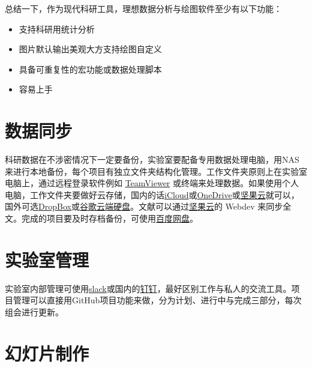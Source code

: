 \documentclass[]{tufte-book}
\providecommand{\tightlist}{%
  \setlength{\itemsep}{0pt}\setlength{\parskip}{0pt}}
\begin{document}
总结一下，作为现代科研工具，理想数据分析与绘图软件至少有以下功能：

\begin{itemize}
\tightlist
\item
  支持科研用统计分析
\item
  图片默认输出美观大方支持绘图自定义
\item
  具备可重复性的宏功能或数据处理脚本
\item
  容易上手
\end{itemize}

\hypertarget{ux6570ux636eux540cux6b65}{%
\section*{数据同步}\label{ux6570ux636eux540cux6b65}}

科研数据在不涉密情况下一定要备份，实验室要配备专用数据处理电脑，用NAS来进行本地备份，每个项目有独立文件夹结构化管理。工作文件夹原则上在实验室电脑上，通过远程登录软件例如 \href{https://www.teamviewer.com/en-us/}{TeamViewer} 或终端来处理数据。如果使用个人电脑，工作文件夹要做好云存储，国内的话\href{https://www.icloud.com/}{iCloud}或\href{https://onedrive.live.com/about/en-us/}{OneDrive}或\href{https://www.jianguoyun.com/\#/}{坚果云}就可以，国外可选\href{https://www.dropbox.com/}{DropBox}或\href{https://drive.google.com/drive/my-drive}{谷歌云端硬盘}。文献可以通过\href{https://www.jianguoyun.com/\#/}{坚果云}的 Webdev 来同步全文。完成的项目要及时存档备份，可使用\href{https://pan.baidu.com/}{百度网盘}。

\hypertarget{ux5b9eux9a8cux5ba4ux7ba1ux7406}{%
\section*{实验室管理}\label{ux5b9eux9a8cux5ba4ux7ba1ux7406}}

实验室内部管理可使用\href{https://slack.com/}{slack}或国内的\href{https://www.dingtalk.com/}{钉钉}，最好区别工作与私人的交流工具。项目管理可以直接用GitHub项目功能来做，分为计划、进行中与完成三部分，每次组会进行更新。

\hypertarget{ux5e7bux706fux7247ux5236ux4f5c}{%
\section*{幻灯片制作}\label{ux5e7bux706fux7247ux5236ux4f5c}}
\end{document}
